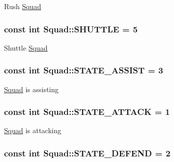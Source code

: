 Rush \hyperlink{class_squad}{Squad} \hypertarget{class_squad_a54980204b8f391319378a8090639e897}{
\subsubsection[{S\-H\-U\-T\-T\-L\-E}]{\setlength{\rightskip}{0pt plus 5cm}const int Squad\-::\-S\-H\-U\-T\-T\-L\-E = 5\hspace{0.3cm}{\ttfamily [static]}}}\label{class_squad_a54980204b8f391319378a8090639e897}
Shuttle \hyperlink{class_squad}{Squad} \hypertarget{class_squad_ace3e1c2898e4e91a1bd5ea8f748cd904}{
\subsubsection[{S\-T\-A\-T\-E\-\_\-\-A\-S\-S\-I\-S\-T}]{\setlength{\rightskip}{0pt plus 5cm}const int Squad\-::\-S\-T\-A\-T\-E\-\_\-\-A\-S\-S\-I\-S\-T = 3\hspace{0.3cm}{\ttfamily [static]}}}\label{class_squad_ace3e1c2898e4e91a1bd5ea8f748cd904}
\hyperlink{class_squad}{Squad} is assisting \hypertarget{class_squad_a649cd577ebc44798880b81df7b28d189}{
\subsubsection[{S\-T\-A\-T\-E\-\_\-\-A\-T\-T\-A\-C\-K}]{\setlength{\rightskip}{0pt plus 5cm}const int Squad\-::\-S\-T\-A\-T\-E\-\_\-\-A\-T\-T\-A\-C\-K = 1\hspace{0.3cm}{\ttfamily [static]}}}\label{class_squad_a649cd577ebc44798880b81df7b28d189}
\hyperlink{class_squad}{Squad} is attacking \hypertarget{class_squad_aafe6f8e836a02ede7e9a88bc335c6644}{
\subsubsection[{S\-T\-A\-T\-E\-\_\-\-D\-E\-F\-E\-N\-D}]{\setlength{\rightskip}{0pt plus 5cm}const int Squad\-::\-S\-T\-A\-T\-E\-\_\-\-D\-E\-F\-E\-N\-D = 2\hspace{0.3cm}{\ttfamily [static]}}}\label{class_squad_aafe6f8e836a02ede7e9a88bc335c6644}

